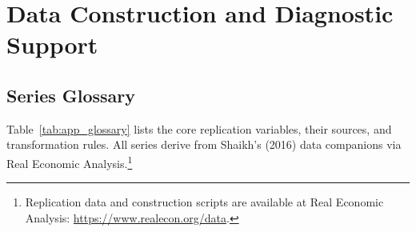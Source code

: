 \section{Data Construction and Diagnostic Support}
\label{app:data_construction}

\subsection{Series Glossary}
\label{subsec:app_glossary}

Table~\ref{tab:app_glossary} lists the core replication variables, their sources, and transformation rules. All series derive from Shaikh's (2016) data companions via Real Economic Analysis.\footnote{Replication data and construction scripts are available at Real Economic Analysis: \url{https://www.realecon.org/data}.}

